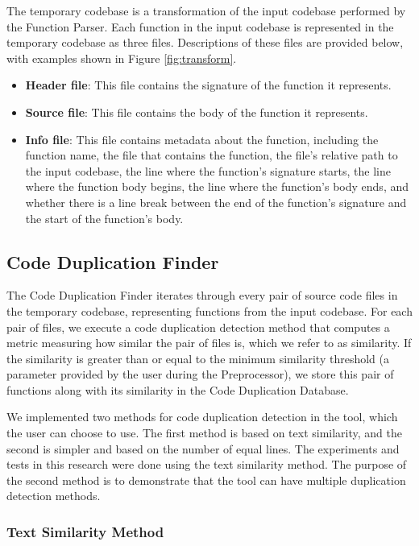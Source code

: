The temporary codebase is a transformation of the input codebase performed by the Function Parser. Each function in the input codebase is represented in the temporary codebase as three files. Descriptions of these files are provided below, with examples shown in Figure \ref{fig:transform}.

\begin{itemize}
	\item \textbf{Header file}: This file contains the signature of the function it represents.
	\item \textbf{Source file}: This file contains the body of the function it represents.
	\item \textbf{Info file}: This file contains metadata about the function, including the function name, the file that contains the function, the file's relative path to the input codebase, the line where the function's signature starts, the line where the function body begins, the line where the function's body ends, and whether there is a line break between the end of the function's signature and the start of the function's body.
\end{itemize}

\subsection{Code Duplication Finder}

\label{subsec:code_finder}

The Code Duplication Finder iterates through every pair of source code files in the temporary codebase, representing 
functions from the input codebase. For each pair of files, we execute a code duplication detection method that computes 
a metric measuring how similar the pair of files is, which we refer to as similarity. 
If the similarity is greater than or equal to the minimum similarity threshold 
(a parameter provided by the user during the Preprocessor), we store this pair of functions along with its 
similarity in the Code Duplication Database.

We implemented two methods for code duplication detection in the tool, which the user can 
choose to use. The first method is based on text similarity, and the second is simpler and 
based on the number of equal lines. The experiments and tests in this research were done 
using the text similarity method. The purpose of the second method is to demonstrate that 
the tool can have multiple duplication detection methods.

\subsubsection{Text Similarity Method}

